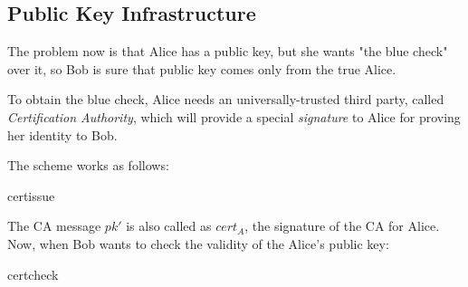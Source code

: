 \subsection{Public Key Infrastructure}

The problem now is that Alice has a public key, but she wants "the blue check" over it, so Bob is sure that public key comes only from the true Alice.

To obtain the blue check, Alice needs an universally-trusted third party, called \textit{Certification Authority}, which will provide a special \textit{signature} to Alice for proving her identity to Bob.

The scheme works as follows:

\begin{cryptosequence}
    {certissue}
    {}



    \cseqdelay

    
    \cseqdelay

    
\end{cryptosequence}

The CA message $pk'$ is also called as $cert_{A}$, the signature of the CA for Alice. Now, when Bob wants to check the validity of the Alice's public key:

\begin{cryptosequence}
    {certcheck}
    {}



    \cseqdelay


    \cseqdelay

    
    \cseqdelay


\end{cryptosequence}

